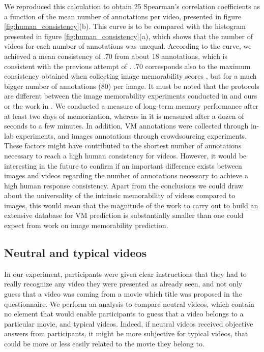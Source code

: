 \documentclass[sigconf]{acmart}
\begin{document}
We reproduced this calculation to obtain 25 Spearman's correlation coefficients as a function of the mean number of annotations per video, presented in figure \ref{fig:human_consistency}(b).
This curve is to be compared with the histogram presented in figure \ref{fig:human_consistency}(a), which shows that the number of videos for each number of annotations was unequal.
According to the curve, we achieved a mean consistency of $.70$ from about 18 annotations, which is consistent with the previous attempt of \cite{han_2015_learning}.
$.70$ corresponds also to the maximum consistency obtained when collecting image memorability scores \cite{isola_2011_makes,khosla_2015_understanding}, but for a much bigger number of annotations (80) per image.
It must be noted that the protocols are different between the image memorability experiments conducted in \cite{isola_2011_makes,khosla_2015_understanding} and ours or the work in \cite{han_2015_learning}.
We conducted a measure of long-term memory performance after at least two days of memorization, whereas in \cite{isola_2011_makes,khosla_2015_understanding} it is measured after a dozen of seconds to a few minutes. 
In addition, VM annotations were collected through in-lab experiments, and images annotations through crowdsourcing experiments.
These factors might have contributed to the shortest number of annotations necessary to reach a high human consistency for videos.
However, it would be interesting in the future to confirm if an important difference exists between images and videos regarding the number of annotations necessary to achieve a high human response consistency.
Apart from the conclusions we could draw about the universality of the intrinsic memorability of videos compared to images, this would mean that the magnitude of the work to carry out to build an extensive database for VM prediction is substantially smaller than one could expect from work on image memorability prediction.

\subsection{Neutral and typical videos}
In our experiment, participants were given clear instructions that they had to really recognize any video they were presented as already seen, and not only guess that a video was coming from a movie which title was proposed in the questionnaire.
We perform an analysis to compare neutral videos, which contain no element that would enable participants to guess that a video belongs to a particular movie, and typical videos.
Indeed, if neutral videos received objective answers from participants, it might be more subjective for typical videos, that could be more or less easily related to the movie they belong to.
\end{document}
